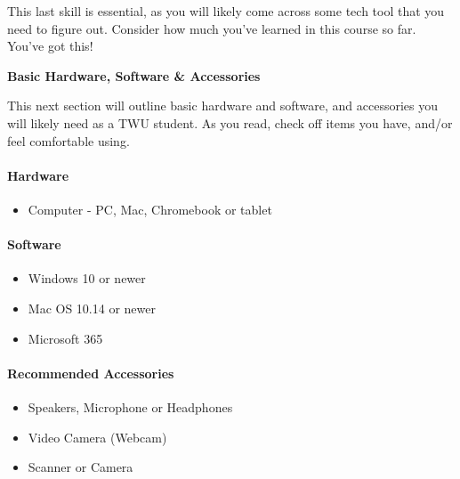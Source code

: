 \documentclass[
]{book}
\providecommand{\tightlist}{%
  \setlength{\itemsep}{0pt}\setlength{\parskip}{0pt}}
\theoremstyle{definition}
\theoremstyle{definition}
\theoremstyle{definition}
\theoremstyle{definition}
\theoremstyle{remark}
\begin{document}
This last skill is essential, as you will likely come across some tech tool that you need to figure out. Consider how much you've learned in this course so far. You've got this!

\textbf{Basic Hardware, Software \& Accessories}

This next section will outline basic hardware and software, and accessories you will likely need as a TWU student. As you read, check off items you have, and/or feel comfortable using.

\hypertarget{hardware}{%
\paragraph*{Hardware}\label{hardware}}

\begin{itemize}
\tightlist
\item
  Computer - PC, Mac, Chromebook or tablet
\end{itemize}

\hypertarget{software}{%
\paragraph*{Software}\label{software}}

\begin{itemize}
\tightlist
\item
  Windows 10 or newer\\
\item
  Mac OS 10.14 or newer\\
\item
  Microsoft 365
\end{itemize}

\hypertarget{recommended-accessories}{%
\paragraph*{Recommended Accessories}\label{recommended-accessories}}

\begin{itemize}
\tightlist
\item
  Speakers, Microphone or Headphones\\
\item
  Video Camera (Webcam)\\
\item
  Scanner or Camera
\end{itemize}
\end{document}
